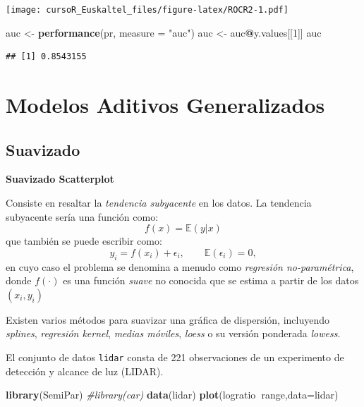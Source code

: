\documentclass[]{book}
\newenvironment{Shaded}{\begin{snugshade}}{\end{snugshade}}
\newcommand{\KeywordTok}[1]{\textcolor[rgb]{0.13,0.29,0.53}{\textbf{#1}}}
\newcommand{\DataTypeTok}[1]{\textcolor[rgb]{0.13,0.29,0.53}{#1}}
\newcommand{\DecValTok}[1]{\textcolor[rgb]{0.00,0.00,0.81}{#1}}
\newcommand{\StringTok}[1]{\textcolor[rgb]{0.31,0.60,0.02}{#1}}
\newcommand{\CommentTok}[1]{\textcolor[rgb]{0.56,0.35,0.01}{\textit{#1}}}
\newcommand{\OperatorTok}[1]{\textcolor[rgb]{0.81,0.36,0.00}{\textbf{#1}}}
\newcommand{\NormalTok}[1]{#1}
\begin{document}
\texttt{[image: cursoR\_Euskaltel\_files/figure-latex/ROCR2-1.pdf]}

\begin{Shaded}
\begin{Highlighting}[]
\NormalTok{auc <-}\StringTok{ }\KeywordTok{performance}\NormalTok{(pr, }\DataTypeTok{measure =} \StringTok{"auc"}\NormalTok{)}
\NormalTok{auc <-}\StringTok{ }\NormalTok{auc}\OperatorTok{@}\NormalTok{y.values[[}\DecValTok{1}\NormalTok{]]}
\NormalTok{auc}
\end{Highlighting}
\end{Shaded}

\begin{verbatim}
## [1] 0.8543155
\end{verbatim}

\chapter{Modelos Aditivos
Generalizados}\label{modelos-aditivos-generalizados}

\section{Suavizado}\label{suavizado}

\textbf{Suavizado Scatterplot}

Consiste en resaltar la \emph{tendencia subyacente} en los datos. La
tendencia subyacente sería una función como: \[
f(x) = \mathbb{E}(y|x)
\] que también se puede escribir como: \[
y_i = f(x_i) + \epsilon_i,\qquad \mathbb{E}(\epsilon_i)=0,
\] en cuyo caso el problema se denomina a menudo como \emph{regresión
no-paramétrica}, donde \(f(\cdot)\) es una función \emph{suave} no
conocida que se estima a partir de los datos \((x_i,y_i)\) \bigskip

Existen varios métodos para suavizar una gráfica de dispersión,
incluyendo \emph{splines}, \emph{regresión kernel}, \emph{medias
móviles}, \emph{loess} o su versión ponderada \emph{lowess}.

El conjunto de datos \texttt{lidar} consta de 221 observaciones de un
experimento de detección y alcance de luz (LIDAR).

\begin{Shaded}
\begin{Highlighting}[]
\KeywordTok{library}\NormalTok{(SemiPar)}
\CommentTok{#library(car)}
\KeywordTok{data}\NormalTok{(lidar)}
\KeywordTok{plot}\NormalTok{(logratio}\OperatorTok{~}\NormalTok{range,}\DataTypeTok{data=}\NormalTok{lidar)}
\end{Highlighting}
\end{Shaded}
\end{document}
